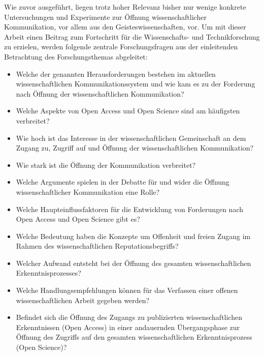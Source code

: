 Wie zuvor ausgeführt, liegen trotz hoher Relevanz bisher nur wenige konkrete Untersuchungen und Experimente zur Öffnung wissenschaftlicher Kommunikation, vor allem aus den Geisteswissenschaften, vor. Um mit dieser Arbeit einen Beitrag zum Fortschritt für die Wissenschafts- und Technikforschung zu erzielen, werden folgende zentrale Forschungsfragen aus der einleitenden Betrachtung des Forschungsthemas abgeleitet:
\begin{itemize}
\item Welche der genannten Herausforderungen bestehen im aktuellen wissenschaftlichen Kommunikationssystem und wie kam es zu der Forderung nach Öffnung der wissenschaftlichen Kommunikation?
\item Welche Aspekte von Open Access und Open Science sind am häufigsten verbreitet?
\item Wie hoch ist das Interesse in der wissenschaftlichen Gemeinschaft an dem Zugang zu, Zugriff auf und Öffnung der wissenschaftlichen Kommunikation?
\item Wie stark ist die Öffnung der Kommunikation verbreitet?
\item Welche Argumente spielen in der Debatte für und wider die Öffnung wissenschaftlicher Kommunikation eine Rolle?
\item Welche Haupteinflussfaktoren für die Entwicklung von Forderungen nach Open Access und Open Science gibt es?
\item Welche Bedeutung haben die Konzepte um Offenheit und freien Zugang im Rahmen des wissenschaftlichen Reputationsbegriffs?
\item Welcher Aufwand entsteht bei der Öffnung des gesamten wissenschaftlichen Erkenntnisprozesses?
\item Welche Handlungsempfehlungen können für das Verfassen einer offenen wissenschaftlichen Arbeit gegeben werden?
\item Befindet sich die Öffnung des Zugangs zu publizierten wissenschaftlichen Erkenntnissen (Open Access) in einer andauernden Übergangsphase zur Öffnung des Zugriffs auf den gesamten wissenschaftlichen Erkenntnisprozess (Open Science)?
\end{itemize}

